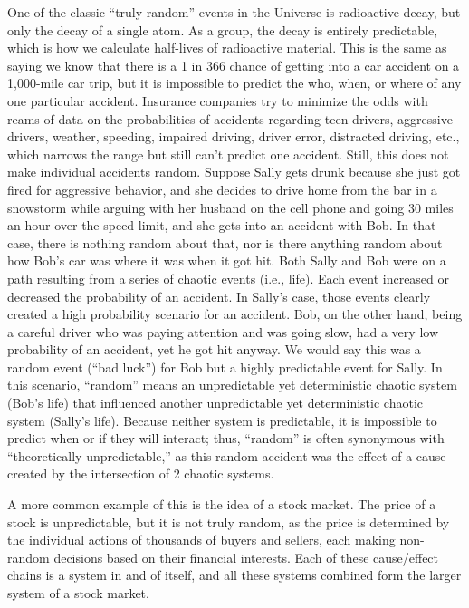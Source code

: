 \documentclass[
]{article}
\begin{document}
One of the classic ``truly random'' events in the Universe is
radioactive decay, but only the decay of a single atom. As a group, the
decay is entirely predictable, which is how we calculate half-lives of
radioactive material. This is the same as saying we know that there is a
1 in 366 chance of getting into a car accident on a 1,000-mile car trip,
but it is impossible to predict the who, when, or where of any one
particular accident. Insurance companies try to minimize the odds with
reams of data on the probabilities of accidents regarding teen drivers,
aggressive drivers, weather, speeding, impaired driving, driver error,
distracted driving, etc., which narrows the range but still can't
predict one accident. Still, this does not make individual accidents
random. Suppose Sally gets drunk because she just got fired for
aggressive behavior, and she decides to drive home from the bar in a
snowstorm while arguing with her husband on the cell phone and going 30
miles an hour over the speed limit, and she gets into an accident with
Bob. In that case, there is nothing random about that, nor is there
anything random about how Bob's car was where it was when it got hit.
Both Sally and Bob were on a path resulting from a series of chaotic
events (i.e., life). Each event increased or decreased the probability
of an accident. In Sally's case, those events clearly created a high
probability scenario for an accident. Bob, on the other hand, being a
careful driver who was paying attention and was going slow, had a very
low probability of an accident, yet he got hit anyway. We would say this
was a random event (``bad luck'') for Bob but a highly predictable event
for Sally. In this scenario, ``random'' means an unpredictable yet
deterministic chaotic system (Bob's life) that influenced another
unpredictable yet deterministic chaotic system (Sally's life). Because
neither system is predictable, it is impossible to predict when or if
they will interact; thus, ``random'' is often synonymous with
``theoretically unpredictable,'' as this random accident was the effect
of a cause created by the intersection of 2 chaotic systems.

A more common example of this is the idea of a stock market. The price
of a stock is unpredictable, but it is not truly random, as the price is
determined by the individual actions of thousands of buyers and sellers,
each making non-random decisions based on their financial interests.
Each of these cause/effect chains is a system in and of itself, and all
these systems combined form the larger system of a stock market.
\end{document}
